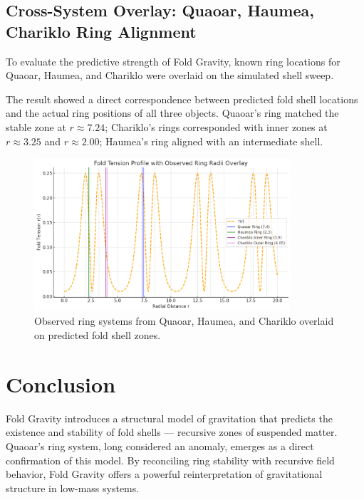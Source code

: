 \documentclass[12pt]{article}
\begin{document}
\vspace{1em}
\FloatBarrier

\subsection{Cross-System Overlay: Quaoar, Haumea, Chariklo Ring Alignment}

To evaluate the predictive strength of Fold Gravity, known ring locations for Quaoar, Haumea, and Chariklo were overlaid on the simulated shell sweep.

The result showed a direct correspondence between predicted fold shell locations and the actual ring positions of all three objects. Quaoar’s ring matched the stable zone at $r \approx 7.24$; Chariklo’s rings corresponded with inner zones at $r \approx 3.25$ and $r \approx 2.00$; Haumea’s ring aligned with an intermediate shell.

\begin{figure}[H]
  \centering
  \includegraphics[width=0.85\textwidth]{fold_shell_sweep_overlay.png}
  \caption{Observed ring systems from Quaoar, Haumea, and Chariklo overlaid on predicted fold shell zones.}
\end{figure}

\section{Conclusion}
Fold Gravity introduces a structural model of gravitation that predicts the existence and stability of fold shells — recursive zones of suspended matter. Quaoar’s ring system, long considered an anomaly, emerges as a direct confirmation of this model. By reconciling ring stability with recursive field behavior, Fold Gravity offers a powerful reinterpretation of gravitational structure in low-mass systems.
\end{document}
